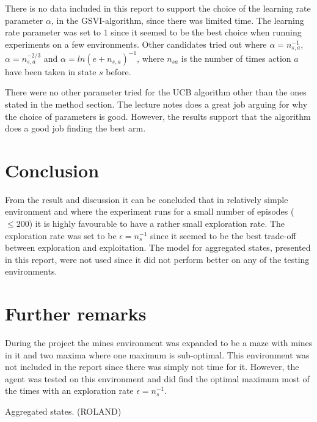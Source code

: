 \documentclass[11pt]{article}
\numberwithin{equation}{section}
\begin{document}
\begin{flushleft}
There is no data included in this report to support the choice of the learning rate parameter $\alpha$, in the GSVI-algorithm, since there was limited time. The learning rate parameter was set to $1$ since it seemed to be the best choice when running experiments on a few environments. Other candidates tried out where $\alpha = n_{s,a}^{-1}$, $\alpha = n_{s,a}^{-2/3}$ and $\alpha = ln(e + n_{s,a})^{-1}$, where $n_{sa}$ is the number of times action $a$ have been taken in state $s$ before. \newline 

There were no other parameter tried for the UCB algorithm other than the ones stated in the method section. The lecture notes does a great job arguing for why the choice of parameters is good. However, the results support that the algorithm does a good job finding the best arm. \newline



\section{Conclusion}

From the result and discussion it can be concluded that in relatively simple environment and where the experiment runs for a small number of episodes ($\le 200$) it is highly favourable to have a rather small exploration rate. The exploration rate was set to be $\epsilon = n_s^{-1}$ since it seemed to be the best trade-off between exploration and exploitation. The model for aggregated states, presented in this report, were not used since it did not perform better on any of the testing environments.

\section{Further remarks}

During the project the mines environment was expanded to be a maze with mines in it and two maxima where one maximum is sub-optimal. This environment was not included in the report since there was simply not time for it. However, the agent was tested on this environment and did find the optimal maximum most of the times with an exploration rate $\epsilon = n_s^{-1}$. \newline 

Aggregated states. (ROLAND)

\end{flushleft}
\end{document}
